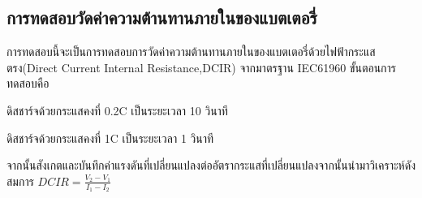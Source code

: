 \subsection{การทดสอบวัดค่าความต้านทานภายในของแบตเตอรี่}
การทดสอบนี้จะเป็นการทดสอบการวัดค่าความต้านทานภายในของแบตเตอรี่ด้วยไฟฟ้ากระแสตรง(Direct Current Internal Resistance,DCIR)
จากมาตรฐาน IEC61960 ขั้นตอนการทดสอบคือ
\begin{enumerate}
{\item ดิสชาร์จด้วยกระแสคงที่ 0.2C เป็นระยะเวลา 10 วินาที}
{\item ดิสชาร์จด้วยกระแสคงที่ 1C เป็นระยะเวลา 1 วินาที}
\end{enumerate}
จากนั้นสังเกตและบันทึกค่าแรงดันที่เปลี่ยนแปลงต่ออัตรากระแสที่เปลี่ยนแปลงจากนั้นนำมาวิเคราะห์ดังสมการ
$ DCIR = \frac{V_2-V_1}{I_1-I_2} $
